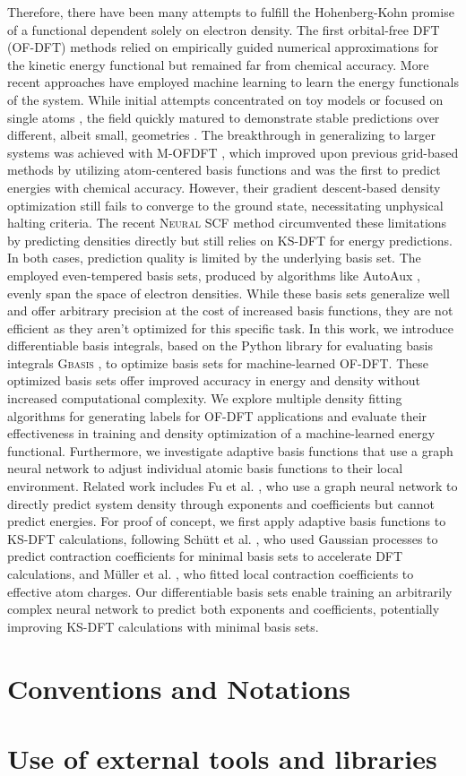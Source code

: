 Therefore, there have been many attempts to fulfill the Hohenberg-Kohn promise of a functional dependent solely on electron density. The first orbital-free DFT (OF-DFT) methods relied on empirically guided numerical approximations for the kinetic energy functional \cite{thakkar1992comparison,wang1999orbital} but remained far from chemical accuracy. More recent approaches have employed machine learning to learn the energy functionals of the system. While initial attempts concentrated on toy models \cite{snyder2012finding,li2016pure,meyer2020machine} or focused on single atoms \cite{ghasemi2021artificial}, the field quickly matured to demonstrate stable predictions over different, albeit small, geometries \cite{remme_kineticnet_2023,imoto2021order}. The breakthrough in generalizing to larger systems was achieved with \textsc{M-OFDFT} \cite{zhang_m-ofdft_2023}, which improved upon previous grid-based methods by utilizing atom-centered basis functions and was the first to predict energies with chemical accuracy. However, their gradient descent-based density optimization still fails to converge to the ground state, necessitating unphysical halting criteria. The recent \textsc{Neural SCF} method \cite{song_neuralscf_2024} circumvented these limitations by predicting densities directly but still relies on KS-DFT for energy predictions.
In both cases, prediction quality is limited by the underlying basis set. The employed even-tempered basis sets, produced by algorithms like AutoAux \cite{autoaux}, evenly span the space of electron densities. While these basis sets generalize well and offer arbitrary precision at the cost of increased basis functions, they are not efficient as they aren't optimized for this specific task.
In this work, we introduce differentiable basis integrals, based on the Python library for evaluating basis integrals \textsc{Gbasis} \cite{kim_gbasis_2024}, to optimize basis sets for machine-learned OF-DFT. These optimized basis sets offer improved accuracy in energy and density without increased computational complexity. We explore multiple density fitting algorithms for generating labels for OF-DFT applications and evaluate their effectiveness in training and density optimization of a machine-learned energy functional.
Furthermore, we investigate adaptive basis functions that use a graph neural network to adjust individual atomic basis functions to their local environment. Related work includes Fu et al. \cite{fu_recipe_2024}, who use a graph neural network to directly predict system density through exponents and coefficients but cannot predict energies. For proof of concept, we first apply adaptive basis functions to KS-DFT calculations, following Schütt et al. \cite{schutt_machine_2018}, who used Gaussian processes to predict contraction coefficients for minimal basis sets to accelerate DFT calculations, and Müller et al. \cite{muller_atom--molecule_2023}, who fitted local contraction coefficients to effective atom charges. Our differentiable basis sets enable training an arbitrarily complex neural network to predict both exponents and coefficients, potentially improving KS-DFT calculations with minimal basis sets.
\newpage
\section{Conventions and Notations}

\section{Use of external tools and libraries}
